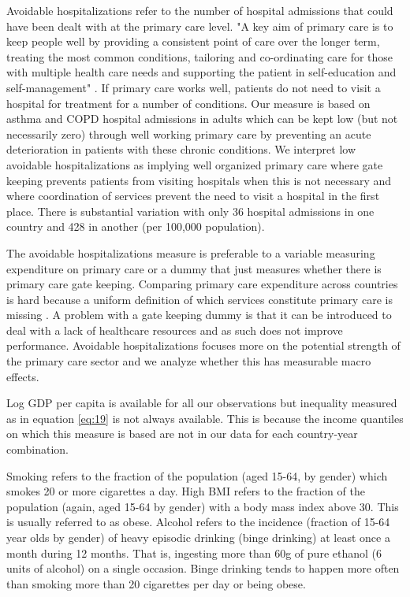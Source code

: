 \documentclass{article}
\begin{document}
Avoidable hospitalizations refer to the number of hospital admissions that could have been dealt with at the primary care level. "A key aim of primary care is to keep people well by providing a consistent point of care over the longer term, treating the most common conditions, tailoring and co-ordinating care for those with multiple health care needs and supporting the patient in self-education and self-management" \citep{OECD_avoidable_hospitalizations}. If primary care works well, patients do not need to visit a hospital for treatment for a number of conditions. Our measure is based on asthma and COPD hospital admissions in adults which can be kept low (but not necessarily zero) through well working primary care by preventing an acute deterioration in patients with these chronic conditions. We interpret low avoidable hospitalizations as implying well organized primary care where gate keeping prevents patients from visiting hospitals when this is not necessary and where coordination of services prevent the need to visit a hospital in the first place. There is substantial variation with only 36 hospital admissions in one country and 428 in another (per 100,000 population).

The avoidable hospitalizations measure is preferable to a variable measuring expenditure on primary care or a dummy that just measures whether there is primary care gate keeping. Comparing primary care expenditure across countries is hard because a uniform definition of which services constitute primary care is missing \citep{OECD_2020}. A problem with a gate keeping dummy is that it can be introduced to deal with a lack of healthcare resources and as such does not improve performance. Avoidable hospitalizations focuses more on the potential strength of the primary care sector and we analyze whether this has measurable macro effects.

Log GDP per capita is available for all our observations but inequality measured as in equation \eqref{eq:19} is not always available. This is because the income quantiles on which this measure is based are not in our data for each country-year combination.

Smoking refers to the fraction of the population (aged 15-64, by gender) which smokes 20 or more cigarettes a day. High BMI refers to the fraction of the population (again, aged 15-64 by gender) with a body mass index above 30. This is usually referred to as obese. Alcohol refers to the incidence (fraction of 15-64 year olds by gender) of heavy episodic drinking (binge drinking) at least once a month during 12 months. That is, ingesting more than 60g of pure ethanol (6 units of alcohol) on a single occasion. Binge drinking tends to happen more often than smoking more than 20 cigarettes per day or being obese.
\end{document}
